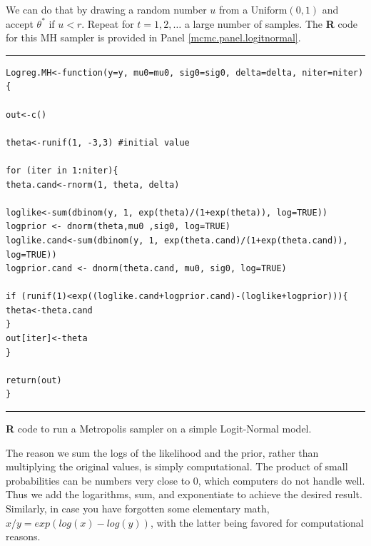

We can do that by drawing a random number $u$ from a
$\mbox{Uniform}(0,1)$ and accept $\theta^{*}$ if
$u<r$.
Repeat for $t = 1,2,\ldots$ a large number of samples.
The {\bf R} code for this MH sampler is provided in Panel \ref{mcmc.panel.logitnormal}.

\begin{panel}[htp]
\centering
\rule[0.15in]{\textwidth}{.03in}
{\small
\begin{verbatim}
Logreg.MH<-function(y=y, mu0=mu0, sig0=sig0, delta=delta, niter=niter) {

out<-c()

theta<-runif(1, -3,3) #initial value

for (iter in 1:niter){
theta.cand<-rnorm(1, theta, delta)

loglike<-sum(dbinom(y, 1, exp(theta)/(1+exp(theta)), log=TRUE))
logprior <- dnorm(theta,mu0 ,sig0, log=TRUE)
loglike.cand<-sum(dbinom(y, 1, exp(theta.cand)/(1+exp(theta.cand)), 
log=TRUE))
logprior.cand <- dnorm(theta.cand, mu0, sig0, log=TRUE)

if (runif(1)<exp((loglike.cand+logprior.cand)-(loglike+logprior))){
theta<-theta.cand
}
out[iter]<-theta
}

return(out)
}
\end{verbatim}
}
\rule[-0.15in]{\textwidth}{.03in}
\caption{
{\bf R} code to run a Metropolis sampler on a simple Logit-Normal model.
}
\label{mcmc.panel.logitnormal}
\end{panel}



The reason we sum the logs of the likelihood and the prior, rather
than multiplying the original values, is simply computational. The
product of small probabilities can be numbers very close to 0, which
computers do not handle well. Thus we add the logarithms, sum, and
exponentiate to achieve the desired result. Similarly, in case you
have forgotten some elementary math, $x/y = exp(log(x)-log(y))$, with
the latter being favored for computational reasons.

